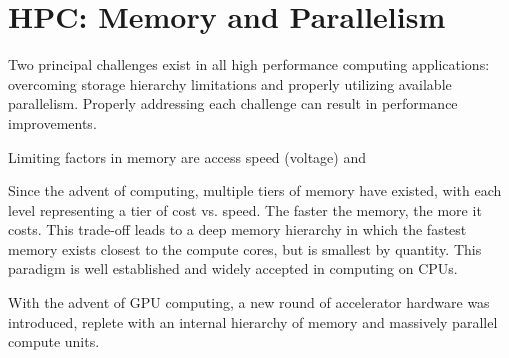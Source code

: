 \section{HPC: Memory and Parallelism}

Two principal challenges exist in all high performance computing applications: overcoming storage hierarchy limitations and properly utilizing available parallelism. Properly addressing each challenge can result in performance improvements. 

Limiting factors in memory are access speed (voltage) and 

Since the advent of computing, multiple tiers of memory have existed, with each level representing a tier of cost vs. speed. The faster the memory, the more it costs. This trade-off leads to a deep memory hierarchy in which the fastest memory exists closest to the compute cores, but is smallest by quantity. This paradigm is well established and widely accepted in computing on CPUs. 

With the advent of GPU computing, a new round of accelerator hardware was introduced, replete with an internal hierarchy of memory and massively parallel compute units. 